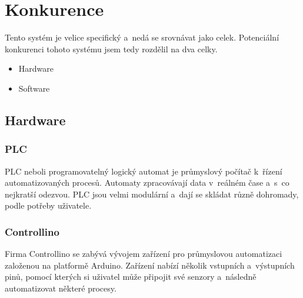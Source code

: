 \chapter{Konkurence}
Tento systém je velice specifický a~nedá se srovnávat jako celek. 
Potenciální konkurenci tohoto systému jsem tedy rozdělil na dva celky.

\begin{itemize} %
    \item Hardware
    \item Software
\end{itemize}



\section{Hardware}

\fxnote[author=JA]{\textcolor{mygreen}{Přidat obrázky}}

\subsection{PLC}
PLC neboli programovatelný logický automat je průmyslový počítač k~řízení automatizovaných procesů.
Automaty zpracovávají data v~reálném čase a~s~co nejkratší odezvou.
PLC jsou velmi modulární a~dají se skládat různě dohromady, podle potřeby uživatele.



\subsection{Controllino}
Firma Controllino\cite{CONTROLLINO} se zabývá vývojem zařízení pro průmyslovou automatizaci založenou na platformě Arduino.
Zařízení nabízí několik vstupních a~výstupních pinů, pomocí kterých si uživatel může připojit své senzory a~následně automatizovat některé procesy. 




